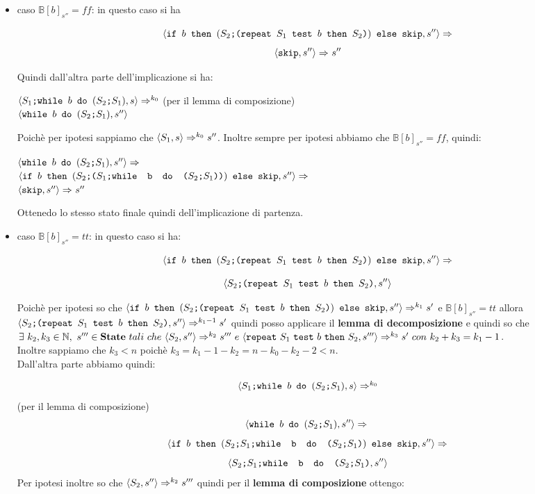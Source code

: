 {	\begin{itemize}
		\item caso $\mathbb{B}[b]_{s''}=ff$: in questo caso si ha 

		\[ \confSs{\ifABC{b}{(\concat{$S_2$}{(\repeatSbS{$S_1$}{$b$}{$S_2$})})}
		{\skipistr}}{s''}\Rar{} \]
		\[ \confSs{\skipistr}{s''}\Rar{}s'' \]

		Quindi dall'altra parte dell'implicazione si ha:
		\begin{center}
		$\confSs{\PDef{}}{s}\Rar{k_0}$ (per il lemma di composizione)\\
		$\confSs{\wbS{b}{(\concat{$S_2$}{$S_1$})}}{s''}$
		\end{center}
		Poichè per ipotesi sappiamo che $\confSs{S_1}{s}\Rar{k_0}s''$. Inoltre
		sempre per ipotesi abbiamo che $\mathbb{B}[b]_{s''}=ff$, quindi:
		\begin{center}
		$\confSs{\wbS{b}{(\concat{$S_2$}{$S_1$})}}{s''}\Rar{}$\\
		$\confSs{\ifABC{b}{(\concat{$S_2$}{(\concat{$S_1$}
		{\wbS{b}{(\concat{$S_2$}{$S_1$})}})})}{\skipistr}}{s''}\Rar{}$\\
		$\confSs{\skipistr}{s''}\Rar{}s''$
		\end{center}
		Ottenedo lo stesso stato finale quindi dell'implicazione di partenza.

		\item caso $\mathbb{B}[b]_{s''}=tt$: in questo caso si ha:

		\[ \confSs{\ifABC{b}{(\concat{$S_2$}{(\repeatSbS{$S_1$}{$b$}{$S_2$})})}
		{\skipistr}}{s''}\Rar{} \]
	
		\[ \confSs{\concat{$S_2$}{(\repeatSbS{$S_1$}{$b$}{$S_2$})}}{s''} \]

		Poichè per ipotesi so che $\confSs{\ifABC{b}{(\concat{$S_2$}
		{(\repeatSbS{$S_1$}{$b$}{$S_2$})})}{\skipistr}}{s''}\Rar{k_1}s'$ e 
		$\mathbb{B}[b]_{s''}=tt$ allora 
		$\confSs{\concat{$S_2$}{(\repeatSbS{$S_1$}{$b$}{$S_2$})}}{s''}
		\Rar{k_1-1}s'$ quindi posso applicare il \textbf{lemma di 
		decomposizione} e quindi so che $\exists{}~k_2,k_3\in{}\mathbb{N},~
		s'''\in{}\states{}~tali~che~\confSs{S_2}{s''}\Rar{k_2}s'''~e
		~\confSs{\repeatSbS{S_1}{b}{S_2}}{s'''}\Rar{k_3}s'~con~
		k_2+k_3=k_1-1$.\\
		Inoltre sappiamo che $k_3<n$ poichè $k_3=k_1-1-k_2=n-k_0-k_2-2<n$.\\
		Dall'altra parte abbiamo quindi:
	
		\[ \confSs{\PDef{}}{s}\Rar{k_0}\] (per il lemma di composizione)\\
		\[\confSs{\wbS{b}{(\concat{$S_2$}{$S_1$})}}{s''}\Rar{}\\ \]
		\[\confSs{\ifABC{b}{(\concat{\concat{$S_2$}{$S_1$}}
		{\wbS{b}{(\concat{$S_2$}{$S_1$})}})}{\skipistr}}{s''}\Rar{}\]
		\[\confSs{\concat{\concat{$S_2$}{$S_1$}}
		{\wbS{b}{(\concat{$S_2$}{$S_1$})}}}{s''}\]
		Per ipotesi inoltre so che $\confSs{S_2}{s''}\Rar{k_2}s'''$ quindi per
		il \textbf{lemma di composizione} ottengo:
	

\end{itemize}}
